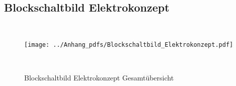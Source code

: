 \documentclass[main.tex]{subfiles} %
\begin{document}


\clearpage
{}
\begin{landscape}

    \section{Blockschaltbild Elektrokonzept}~\label{appendix:Blockschaltbild_Elektrokonzept}
    \begin{figure}[H]
        \centering
        \texttt{[image: ../Anhang\_pdfs/Blockschaltbild\_Elektrokonzept.pdf]}
        \caption{Blockschaltbild Elektrokonzept Gesamtübersicht}~\label{fig:Konzept_graphml}
    \end{figure}

\end{landscape}
\restoregeometry
\end{document}

